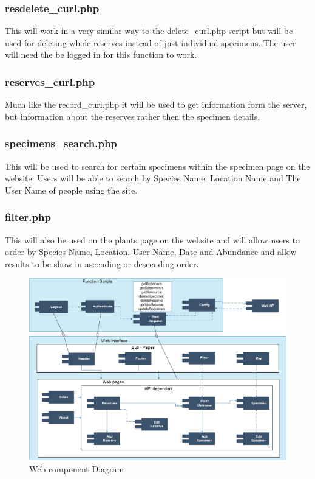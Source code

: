     \subsubsection{resdelete\_curl.php}
        This will work in a very similar way to the delete\_curl.php script but will be used for deleting whole reserves instead of just individual specimens. The user will need the be logged in for this function to work. 

    \subsubsection{reserves\_curl.php}
        Much like the record\_curl.php it will be used to get information form the server, but information about the reserves rather then the specimen details.

    \subsubsection{specimens\_search.php}
        This will be used to search for certain specimens within the specimen page on the website. Users will be able to search by Species Name, Location Name and The User Name of people using the site.

    \subsubsection{filter.php}
        This will also be used on the plants page on the website and will allow users to order by Species Name, Location, User Name, Date and Abundance and allow results to be show in ascending or descending order.

\begin{landscape}
    \begin{figure}
        \centering
        \includegraphics[scale=0.75]{web/webComponentDiagram.png}
        \caption{Web component Diagram}
        \label{fig:webComponentDiagram}
    \end{figure}
\end{landscape}


